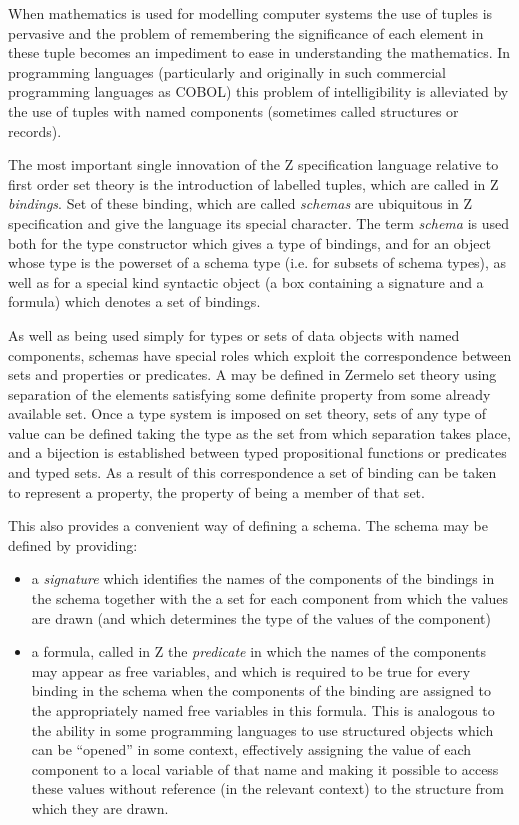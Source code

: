 \documentclass[10pt,titlepage]{book}
\begin{document}
When mathematics is used for modelling computer systems the use of tuples is pervasive and the problem of remembering the significance of each element in these tuple becomes an impediment to ease in understanding the mathematics.
In programming languages (particularly and originally in such commercial programming languages as COBOL) this problem of intelligibility is alleviated by the use of tuples with named components (sometimes called structures or records).

The most important single innovation of the Z specification language relative to first order set theory is the introduction of labelled tuples, which are called in Z {\it bindings}.
Set of these binding, which are called {\it schemas} are ubiquitous in Z specification and give the language its special character.
The term {\it schema} is used both for the type constructor which gives a type of bindings, and for an object whose type is the powerset of a schema type (i.e. for subsets of schema types), as well as for a special kind syntactic object (a box containing a signature and a formula) which denotes a set of bindings.

As well as being used simply for types or sets of data objects with named components, schemas have special roles which exploit the correspondence between sets and properties or predicates.
A may be defined in Zermelo set theory using separation of the elements satisfying some definite property from some already available set.
Once a type system is imposed on set theory, sets of any type of value can be defined taking the type as the set from which separation takes place, and a bijection is established between typed propositional functions or predicates and typed sets.
As a result of this correspondence a set of binding can be taken to represent a property, the property of being a member of that set.

This also provides a convenient way of defining a schema.
The schema may be defined by providing:

\begin{itemize}
\item a {\it signature} which identifies the names of the components of the bindings in the schema together with the a set for each component from which the values are drawn (and which determines the type of the values of the component)
\item a formula, called in Z the {\it predicate} in which the names of the components may appear as free variables, and which is required to be true for every binding in the schema when the components of the binding are assigned to the appropriately named free variables in this formula.
This is analogous to the ability in some programming languages to use structured objects which can be ``opened'' in some context, effectively assigning the value of each component to a local variable of that name and making it possible to access these values without reference (in the relevant context) to the structure from which they are drawn.
\end{itemize}
\end{document}
